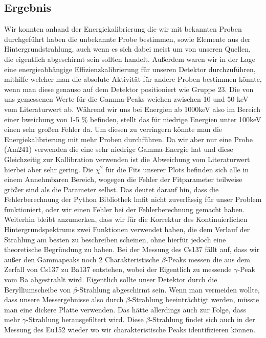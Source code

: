 \documentclass[]{article}
\begin{document}
	\subsection{Ergebnis}
	Wir konnten anhand der Energiekalibrierung die wir mit bekannten Proben durchgeführt haben die unbekannte Probe bestimmen, sowie Elemente aus der Hintergrundstrahlung, auch wenn es sich dabei meist um von unseren Quellen, die eigentlich abgeschirmt sein sollten handelt. Außerdem waren wir in der Lage eine energieabhängige Effizienzkalibrierung für unseren Detektor durchzuführen, mithilfe welcher man die absolute Aktivität für andere Proben bestimmen könnte, wenn man diese genauso auf dem Detektor positioniert wie Gruppe 23. Die von uns gemessenen Werte für die Gamma-Peaks weichen zwischen 10 und 50 keV vom Literaturwert ab. Während wir uns bei Energien ab 1000keV also im Bereich einer bweichung von 1-5 \% befinden, stellt das für niedrige Energien unter 100keV einen sehr großen Fehler da. Um diesen zu verringern könnte man die Energiekalibrierung mit mehr Proben durchführen. Da wir aber nur eine Probe (Am241) verwenden die eine sehr niedrige Gamma-Energie hat und diese Gleichzeitig zur Kallibration verwenden ist die Abweichung vom Literaturwert hierbei aber sehr gering. Die $\chi^2$ für die Fits unserer Plots befinden sich alle in einem Annehmbaren Bereich, wogegen die Fehler der Fitparameter teilweise größer sind als die Parameter selbst. Das deutet darauf hin, dass die Fehlerberechnung der Python Bibliothek lmfit nicht zuverlässig für unser Problem funktioniert, oder wir einen Fehler bei der Fehlerberechnung gemacht haben. Weiterhin bleibt anzumerken, dass wir für die Korrektur des Kontinuierlichen Hintergrundspektrums  zwei Funktionen verwendet haben, die dem Verlauf der Strahlung am besten zu beschreiben scheinen, ohne hierfür jedoch eine theoretische Begründung zu haben. Bei der Messung des Cs137 fällt auf, dass wir außer den Gammapeaks noch 2 Charakteristische $\beta$-Peaks messen die aus dem Zerfall von Cs137 zu Ba137 entstehen, wobei der Eigentlich zu messende $\gamma$-Peak vom Ba abgestrahlt wird. Eigentlich sollte unser Detektor durch die Berylliumscheibe von $\beta$-Strahlung abgeschirmt sein. Wenn man vermeiden wollte, dass unsere Messergebnisse also durch $\beta$-Strahlung beeinträchtigt werden, müsste man eine dickere Platte verwenden. Das hätte allerdings auch zur Folge, dass mehr $\gamma$-Strahlung herausgefiltert wird. Diese $\beta$-Strahlung findet sich auch in der Messung des Eu152 wieder wo wir charakteristische Peaks identifizieren können.	%
	
\end{document}
